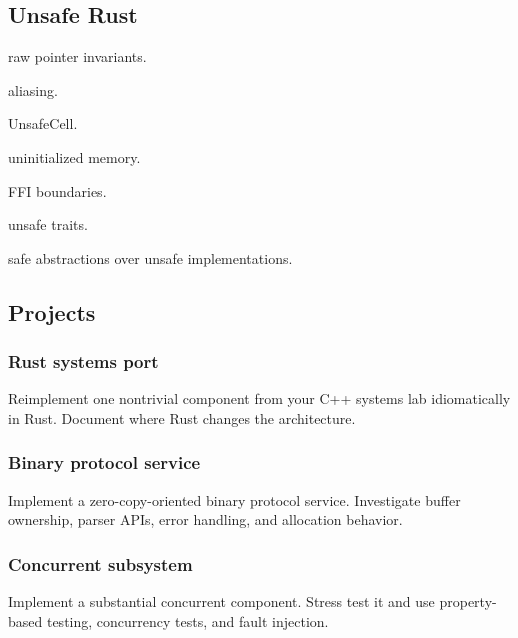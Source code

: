 \documentclass[11pt,letterpaper]{article}
\begin{document}
\subsection*{Unsafe Rust}

\begin{topics}

\item raw pointer invariants.

\item aliasing.

\item UnsafeCell.

\item uninitialized memory.

\item FFI boundaries.

\item unsafe traits.

\item safe abstractions over unsafe implementations.

\end{topics}

\subsection*{Projects}

\subsubsection*{Rust systems port}

Reimplement one nontrivial component from your C++ systems lab idiomatically in Rust. Document where Rust changes the architecture.

\subsubsection*{Binary protocol service}

Implement a zero-copy-oriented binary protocol service. Investigate buffer ownership, parser APIs, error handling, and allocation behavior.

\subsubsection*{Concurrent subsystem}

Implement a substantial concurrent component. Stress test it and use property-based testing, concurrency tests, and fault injection.
\end{document}
